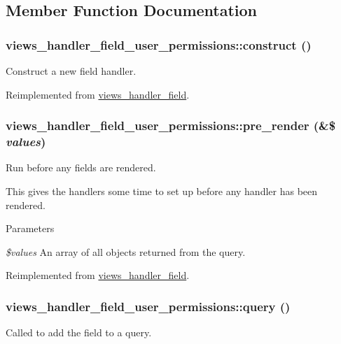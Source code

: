 \subsection{Member Function Documentation}
\hypertarget{classviews__handler__field__user__permissions_aac3a7f41e457a5d5e858deb4c955c1af}{
\subsubsection[{construct}]{\setlength{\rightskip}{0pt plus 5cm}views\_\-handler\_\-field\_\-user\_\-permissions::construct ()}}
\label{classviews__handler__field__user__permissions_aac3a7f41e457a5d5e858deb4c955c1af}
Construct a new field handler. 

Reimplemented from \hyperlink{classviews__handler__field_a3d50050864c255b71c842972a45d39f6}{views\_\-handler\_\-field}.\hypertarget{classviews__handler__field__user__permissions_a9c3969e0483e3d161e627e3d6ba5d78e}{
\subsubsection[{pre\_\-render}]{\setlength{\rightskip}{0pt plus 5cm}views\_\-handler\_\-field\_\-user\_\-permissions::pre\_\-render (\&\$ {\em values})}}
\label{classviews__handler__field__user__permissions_a9c3969e0483e3d161e627e3d6ba5d78e}
Run before any fields are rendered.

This gives the handlers some time to set up before any handler has been rendered.


\begin{DoxyParams}{Parameters}
\item[{\em \$values}]An array of all objects returned from the query. \end{DoxyParams}


Reimplemented from \hyperlink{classviews__handler__field_aff134f525e1f83271183939fda4cd0e8}{views\_\-handler\_\-field}.\hypertarget{classviews__handler__field__user__permissions_a45d41134545829f078afa6a477eee823}{
\subsubsection[{query}]{\setlength{\rightskip}{0pt plus 5cm}views\_\-handler\_\-field\_\-user\_\-permissions::query ()}}
\label{classviews__handler__field__user__permissions_a45d41134545829f078afa6a477eee823}
Called to add the field to a query. 


